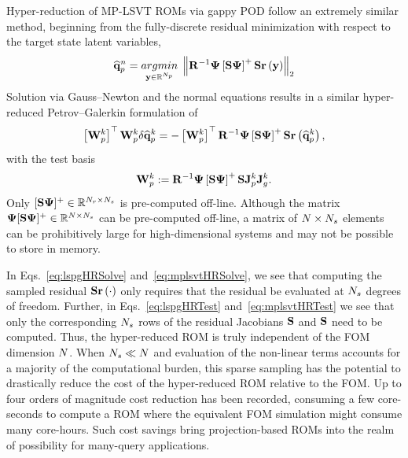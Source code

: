 Hyper-reduction of MP-LSVT ROMs via gappy POD follow an extremely similar method, beginning from the fully-discrete residual minimization with respect to the target state latent variables,
%
\begin{equation}
    \primVecCoef^{\timeIdx} = \argmin{\dummyVec \inROne{\numPrimModes}} \left\Vert \resScaleInv \deimBasis \left[ \sampMat \deimBasis \right]^{+} \sampMat \resFunc{\dummyVec} \right\Vert_2
\end{equation}
%
Solution via Gauss--Newton and the normal equations results in a similar hyper-reduced Petrov--Galerkin formulation of
%
\begin{equation}\label{eq:mplsvtHRSolve}
    \left[ \testBasisPrim^\newtonIdx \right]^\top \testBasisPrim^\newtonIdx \delta \primVecCoef^{\newtonIdx} = -\left[\testBasisPrim^\newtonIdx \right]^\top \resScaleInv \deimBasis \left[ \sampMat \deimBasis \right]^{+} \sampMat \resFunc{\primVecCoef^{\newtonIdx}},
\end{equation}
%
with the test basis
%
\begin{equation}\label{eq:mplsvtHRTest}
    \testBasisPrim^\newtonIdx \defEq \resScaleInv \deimBasis \left[ \sampMat \deimBasis \right]^{+} \sampMat \jacobPrim^{\newtonIdx} \jacobDecode^{\newtonIdx}.
\end{equation}
%
Only $[ \sampMat \deimBasis ]^{+} \inRTwo{\numResModes}{\numSamps}$ is pre-computed off-line. Although the matrix $\deimBasis [ \sampMat \deimBasis ]^{+} \inRTwo{\numDOF}{\numSamps}$ can be pre-computed off-line, a matrix of $N \times N_s$ elements can be prohibitively large for high-dimensional systems and may not be possible to store in memory.

In Eqs.~\ref{eq:lspgHRSolve} and~\ref{eq:mplsvtHRSolve}, we see that computing the sampled residual $\mathbf{S} \mathbf{r}\left(\cdot\right)$ only requires that the residual be evaluated at $N_s$ degrees of freedom. Further, in Eqs.~\ref{eq:lspgHRTest} and~\ref{eq:mplsvtHRTest} we see that only the corresponding $N_s$ rows of the residual Jacobians $\mathbf{S} $ and $\mathbf{S}$ need to be computed. Thus, the hyper-reduced ROM is truly independent of the FOM dimension $N$. When $N_s \ll N$ and evaluation of the non-linear terms accounts for a majority of the computational burden, this sparse sampling has the potential to drastically reduce the cost of the hyper-reduced ROM relative to the FOM. Up to four orders of magnitude cost reduction has been recorded, consuming a few core-seconds to compute a ROM where the equivalent FOM simulation might consume many core-hours. Such cost savings bring projection-based ROMs into the realm of possibility for many-query applications.

